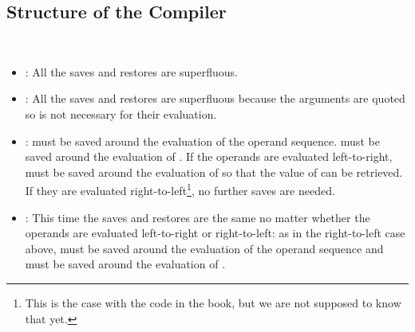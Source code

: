 \subsection{Structure of the Compiler}

\begin{exe}[5.31]
    \ \vspace{-20pt}
    \begin{itemize}
        \item {}: All the saves and restores are superfluous.
        \item {}: All the saves and restores are superfluous 
            because the arguments are quoted so  is not necessary for 
            their evaluation.
        \item {}:  must be saved around the 
            evaluation of the operand sequence.  must be saved around 
            the evaluation of . If the operands are evaluated 
            left-to-right,  must be saved around the evaluation of 
             so that the value of  can be retrieved. If 
            they are evaluated right-to-left\footnote{This is the case with the 
            code in the book, but we are not supposed to know that yet.}, no 
            further saves are needed.
        \item {}: This time the saves and restores are the 
            same no matter whether the operands are evaluated left-to-right or 
            right-to-left: as in the right-to-left case above,  must 
            be saved around the evaluation of the operand sequence and 
             must be saved around the evaluation of .
    \end{itemize}
\end{exe}

